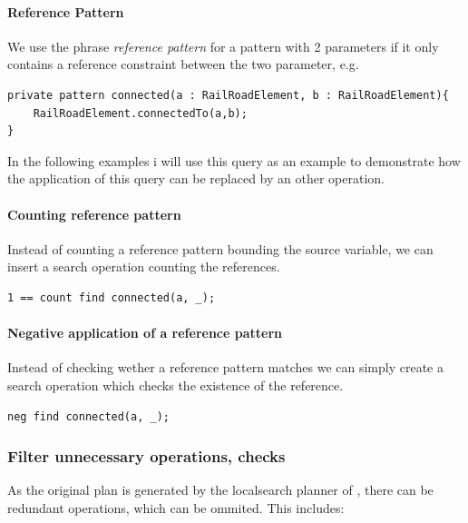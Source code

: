 \paragraph{Reference Pattern}
We use the phrase \emph{reference pattern} for a pattern with 2 parameters if it only contains a reference constraint between the two parameter, e.g.
\begin{lstlisting}[language = vql]
private pattern connected(a : RailRoadElement, b : RailRoadElement){
	RailRoadElement.connectedTo(a,b);
}
\end{lstlisting}

In the following examples i will use this query as an example to demonstrate how the application of this query can be replaced by an other operation.

\paragraph{Counting reference pattern} 
Instead of counting a reference pattern bounding the source variable, we can insert a search operation counting the references.

\begin{lstlisting}[language = vql]
1 == count find connected(a, _);
\end{lstlisting}


\paragraph{Negative application of a reference pattern}
Instead of checking wether a reference pattern matches we can simply create a search operation which checks the existence of the reference.
\begin{lstlisting}[language = vql]
neg find connected(a, _);
\end{lstlisting}



\subsubsection{Filter unnecessary operations, checks}
As the original plan is generated by the localsearch planner of \viatra{}, there can be redundant operations, which can be ommited. This includes:

